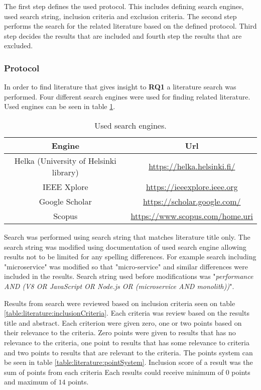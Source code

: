 The first step defines the used protocol.
This includes defining search engines, used search string, inclusion criteria and exclusion criteria.
The second step performs the search for the related literature based on the defined protocol.
Third step decides the results that are included and fourth step the results that are excluded.
\subsubsection{Protocol}
In order to find literature that gives insight to \textbf{RQ1} a literature search was performed.
Four different search engines were used for finding related literature.
Used engines can be seen in table \ref{table:literature:searchEngines}.

\begin{table}[h!]
    \begin{tabular}{| c | c |} 
        \hline
        Engine
        & Url
        \\ [0.5ex] \hline
        
        Helka (University of Helsinki library)
        & \url{https://helka.helsinki.fi/}
        \\ \hline
        
        IEEE Xplore
        & \url{https://ieeexplore.ieee.org}
        \\ \hline
        
        Google Scholar
        & \url{https://scholar.google.com/}
        \\ \hline

        Scopus
        & \url{https://www.scopus.com/home.uri}
        \\ \hline
    \end{tabular}    
    \caption{Used search engines.}
    \label{table:literature:searchEngines}
\end{table}

Search was performed using search string that matches literature title only.
The search string was modified using documentation of used search engine allowing results not to be limited for any spelling differences.
For example search including "microservice" was modified so that "micro-service" and similar differences were included in the results.
Search string used before modifications was "\textit{performance AND (V8 OR JavaScript OR Node.js OR (microservice AND monolith))}".

Results from search were reviewed based on inclusion criteria seen on table \ref{table:literature:inclusionCriteria}.
Each criteria was review based on the results title and abstract.
Each criterion were given zero, one or two points based on their relevance to the criteria.
Zero points were given to results that has no relevance to the criteria, one point to results that has some relevance to criteria and two points to results that are relevant to the criteria.
The points system can be seen in table \ref{table:literature:pointSystem}.
Inclusion score of a result was the sum of points from each criteria
Each results could receive minimum of $0$ points and maximum of $14$ points.

